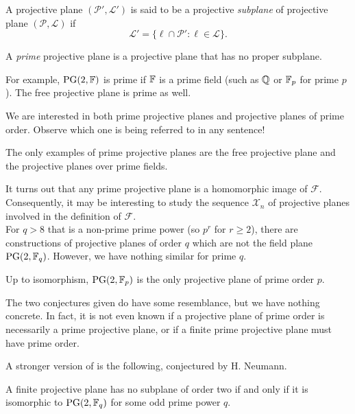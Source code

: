 	\begin{fdef}[Subplane]
		A projective plane $(\mathcal{P}',\mathcal{L}')$ is said to be a projective \emph{subplane} of projective plane $(\mathcal{P},\mathcal{L})$ if
		\[ \mathcal{L}' = \{ \ell \cap \mathcal{P}' : \ell \in \mathcal{L} \}. \]
	\end{fdef}

	\begin{fdef}
		A \emph{prime} projective plane is a projective plane that has no proper subplane.
	\end{fdef}
	For example, $\operatorname{PG}(2,\mathbb{F})$ is prime if $\mathbb{F}$ is a prime field (such as $\mathbb{Q}$ or $\mathbb{F}_p$ for prime $p$). The free projective plane is prime as well.

	\begin{remark}
		We are interested in both prime projective planes and projective planes of prime order. Observe which one is being referred to in any sentence!
	\end{remark}

	\begin{fcon}
		\label{singhi-conj}
		The only examples of prime projective planes are the free projective plane and the projective planes over prime fields.
	\end{fcon}
	It turns out that any prime projective plane is a homomorphic image of $\mathcal{F}$.
	Consequently, it may be interesting to study the sequence $\mathcal{X}_n$ of projective planes involved in the definition of $\mathcal{F}$.\\

	For $q > 8$ that is a non-prime prime power (so $p^r$ for $r \ge 2$), there are constructions of projective planes of order $q$ which are not the field plane $\operatorname{PG}(2,\mathbb{F}_q)$. However, we have nothing similar for prime $q$.

	\begin{fcon}
		\label{cool-conj}
		Up to isomorphism, $\operatorname{PG}(2,\mathbb{F}_p)$ is the only projective plane of prime order $p$.
	\end{fcon}

	The two conjectures given do have some resemblance, but we have nothing concrete. In fact, it is not even known if a projective plane of prime order is necessarily a prime projective plane, or if a finite prime projective plane must have prime order.

	A stronger version of  is the following, conjectured by H. Neumann.

	\begin{fcon}
		A finite projective plane has no subplane of order two if and only if it is isomorphic to $\operatorname{PG}(2,\mathbb{F}_q)$ for some odd prime power $q$. 
	\end{fcon}

